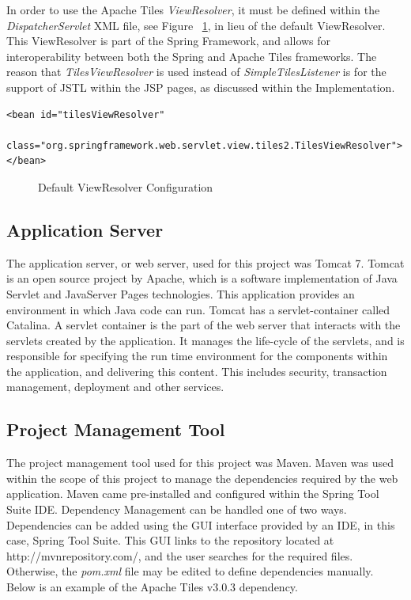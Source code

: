 In order to use the Apache Tiles \textit{ViewResolver}, it must be defined within the \textit{DispatcherServlet} XML file, see Figure ~\ref{fig:tilesViewRes}, in lieu of the default ViewResolver. This ViewResolver is part of the Spring Framework, and allows for interoperability between both the Spring and Apache Tiles frameworks. The reason that \textit{TilesViewResolver} is used instead of \textit{SimpleTilesListener} is for the support of JSTL within the JSP pages, as discussed within the Implementation.

\begin{lstlisting}
<bean id="tilesViewResolver"
	class="org.springframework.web.servlet.view.tiles2.TilesViewResolver">
</bean>
\end{lstlisting}
\begin{figure}[H]
\caption{Default ViewResolver Configuration}
\label{fig:tilesViewRes}
\end{figure}

\subsection{Application Server}

The application server, or web server, used for this project was Tomcat 7.  Tomcat is an open source project by Apache, which is a software implementation of Java Servlet and JavaServer Pages technologies. This application provides an environment in which Java code can run. Tomcat has a servlet-container called Catalina. A servlet container is the part of the web server that interacts with the servlets created by the application. It manages the life-cycle of the servlets, and is responsible for specifying the run time environment for the components within the application, and delivering this content. This includes security, transaction management, deployment and other services. 

\subsection{Project Management Tool}

The project management tool used for this project was Maven. Maven was used within the scope of this project to manage the dependencies required by the web application. Maven came pre-installed and configured within the Spring Tool Suite IDE. Dependency Management can be handled one of two ways. Dependencies can be added using the GUI interface provided by an IDE, in this case, Spring Tool Suite. This GUI links to the repository located at http://mvnrepository.com/, and the user searches for the required files. Otherwise, the \textit{pom.xml} file may be edited to define dependencies manually. Below is an example of the Apache Tiles v3.0.3 dependency.

